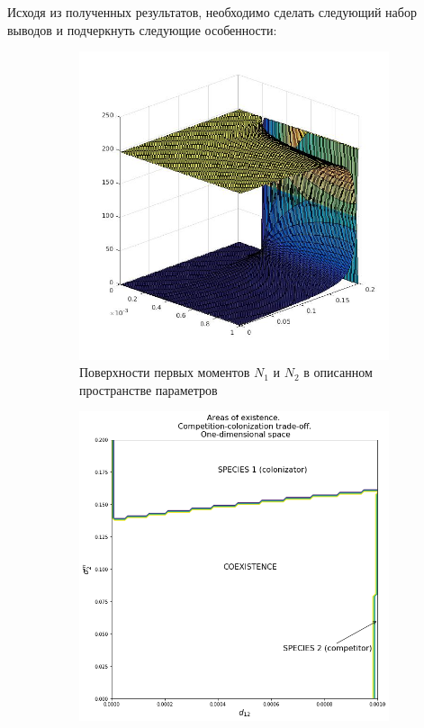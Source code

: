 Исходя из полученных результатов, необходимо сделать следующий набор выводов и подчеркнуть следующие особенности:

\begin{figure}
	\centering
	\begin{subfigure}{.5\textwidth}
		\centering
		\includegraphics[width=.95\linewidth]{N1N2cctoD1.jpg}
		\caption{Поверхности первых моментов \(N_1\) и \(N_2\) в описанном пространстве параметров}
		\label{fig:cctod1:sub1}
	\end{subfigure}%
	\begin{subfigure}{.5\textwidth}
		\centering
		\includegraphics[width=.95\linewidth]{arccto08d1.png}

\end{subfigure}
\end{figure}
